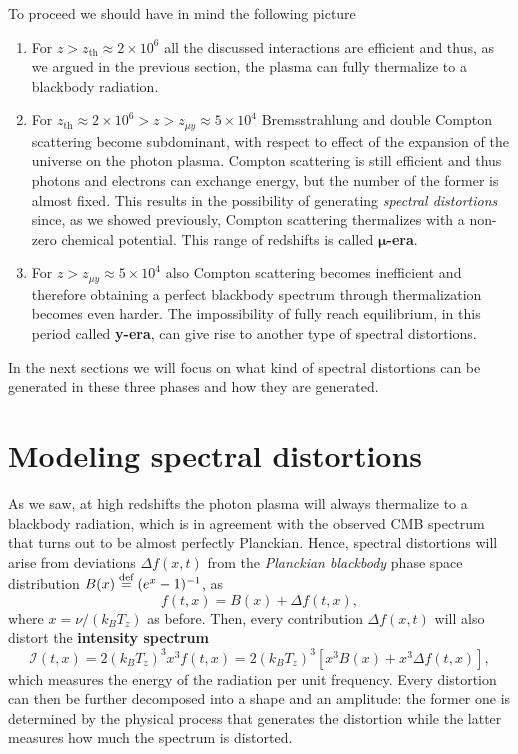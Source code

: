 To proceed we should have in mind the following picture
\begin{enumerate}
    \item For $z>z_{\text{th}}\approx2\times10^6$ all the discussed interactions are efficient and thus, as we argued in the previous section, the plasma can fully thermalize to a blackbody radiation.
    \item For $z_{\text{th}}\approx2\times10^6>z>z_{\mu y}\approx 5\times 10^4$ Bremsstrahlung and double Compton scattering become subdominant, with respect to effect of the expansion of the universe on the photon plasma. Compton scattering is still efficient and thus photons and electrons can exchange energy, but the number of the former is almost fixed. This results in the possibility of generating \emph{spectral distortions} since, as we showed previously, Compton scattering thermalizes with a non-zero chemical potential. This range of redshifts is called $\boldsymbol{\mu}$\textbf{-era}.
    \item For $z>z_{\mu y}\approx 5\times 10^4$ also Compton scattering becomes inefficient and therefore obtaining a perfect blackbody spectrum through thermalization becomes even harder. The impossibility of fully reach equilibrium, in this period called \textbf{y-era}, can give rise to another type of spectral distortions.
\end{enumerate}
In the next sections we will focus on what kind of spectral distortions can be generated in these three phases and how they are generated.
\section{Modeling spectral distortions}
As we saw, at high redshifts the photon plasma will always thermalize to a blackbody radiation, which is in agreement with the observed CMB spectrum that turns out to be almost perfectly Planckian. Hence, spectral distortions will arise from deviations $\Delta f(x,t)$ from the \emph{Planckian blackbody} phase space distribution $B(x)\stackrel{\text{def}}{=}(e^x-1)^{-1}$, as$$f(t,x)=B(x)+\Delta f(t,x),$$ where $x=\nu/(k_BT_z)$ as before. Then, every contribution $\Delta f(x,t)$ will also distort the \textbf{intensity spectrum} $$\mathcal{I}(t,x)=2(k_BT_z)^3 x^3f(t,x)=2(k_BT_z)^3[x^3B(x)+x^3\Delta f(t,x)],$$ which measures the energy of the radiation per unit frequency. Every distortion can then be further decomposed into a shape and an amplitude: the former one is determined by the physical process that generates the distortion while the latter measures how much the spectrum is distorted.

